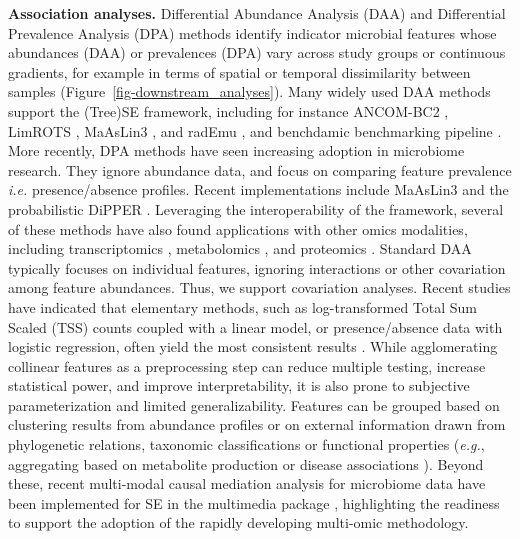 \documentclass[
  sn-nature,
]{sn-jnl}
\begin{document}
\textbf{Association analyses.} Differential Abundance Analysis (DAA) and
Differential Prevalence Analysis (DPA) methods identify indicator
microbial features whose abundances (DAA) or prevalences (DPA) vary
across study groups or continuous gradients, for example in terms of
spatial or temporal dissimilarity between samples
(Figure~\ref{fig-downstream_analyses}). Many widely used DAA methods
support the (Tree)SE framework, including for instance ANCOM-BC2
\citep{lin2024}, LimROTS \citep{anwar2025}, MaAsLin3
\citep{nickols2026}, and radEmu \citep{clausen2026}, and benchdamic
benchmarking pipeline \citep{calgaro2022}. More recently, DPA methods
have seen increasing adoption in microbiome research. They ignore
abundance data, and focus on comparing feature prevalence \emph{i.e.}
presence/absence profiles. Recent implementations include MaAsLin3
\citep{nickols2026} and the probabilistic DiPPER \citep{pelto2026}.
Leveraging the interoperability of the framework, several of these
methods have also found applications with other omics modalities,
including transcriptomics \citep{love2014}, metabolomics
\citep{nickols2026}, and proteomics \citep{anwar2025}. Standard DAA
typically focuses on individual features, ignoring interactions or other
covariation among feature abundances. Thus, we support covariation
analyses. Recent studies have indicated that elementary methods, such as
log-transformed Total Sum Scaled (TSS) counts coupled with a linear
model, or presence/absence data with logistic regression, often yield
the most consistent results \citep{pelto2025, gamboa-tuz2025}. While
agglomerating collinear features as a preprocessing step can reduce
multiple testing, increase statistical power, and improve
interpretability, it is also prone to subjective parameterization and
limited generalizability. Features can be grouped based on clustering
results from abundance profiles or on external information drawn from
phylogenetic relations, taxonomic classifications or functional
properties (\emph{e.g.}, aggregating based on metabolite production
\citep{kullberg2024} or disease associations \citep{geistlinger2024}).
Beyond these, recent multi-modal causal mediation analysis for
microbiome data have been implemented for SE in the multimedia package
\citep{jiang2025}, highlighting the readiness to support the adoption of
the rapidly developing multi-omic methodology.
\end{document}
